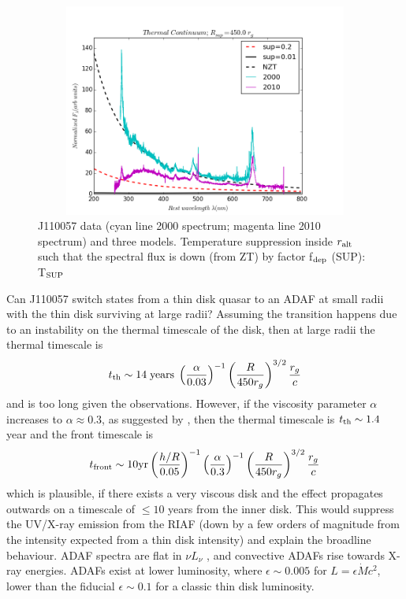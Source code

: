 \documentclass[11pt,a4paper]{article}
\begin{document}
\begin{figure}
  \centering
  \includegraphics[width=16.00cm, height=7.00cm, trim=0.0cm 0.0cm 0.0cm 0.0cm, clip]
  {../plots/models/mcd_gap_v3_1_b1.png}
  \caption[]{
    J110057 data (cyan line 2000 spectrum; magenta line 2010 spectrum) and
    three models.  Temperature suppression inside $r_{\rm alt}$ such that
    the spectral flux is down (from ZT) by factor f$_{\rm dep}$ (SUP): T$_{\rm SUP}$
  }
  \label{fig:disk_suppression}
\end{figure}
Can J110057 switch states from a thin disk quasar to an ADAF at small
radii with the thin disk surviving at large radii?  Assuming the
transition happens due to an instability on the thermal timescale of
the disk, then at large radii the thermal timescale is
\begin{equation}
    t_{\rm th} \sim 14 \; {\rm years} \; \left(\frac{\alpha}{0.03}\right)^{-1}
                                                \left(\frac{R}{450r_{g}}\right)^{3/2} 
                                                        \frac{r_{g}}{c}
\end{equation} 
and is too long given the observations. However, if the viscosity
parameter $\alpha$ increases to $\alpha \approx 0.3$, as suggested by
\citet{King2007}, then the thermal timescale is $t_{\rm th} \sim 1.4$
year and the front timescale is
\begin{equation}
    t_{\rm front}  \sim  10{\rm yr}  \left(\frac{h/R}{0.05}\right)^{-1}
                                                 \left(\frac{\alpha}{0.3}\right)^{-1}  
                                                 \left(\frac{R}{450r_{g}}\right)^{3/2}  
                                                         \frac{r_{g}}{c}
\label{eqn:t_front}
\end{equation}
which is plausible, if there exists a very viscous disk and the effect
propagates outwards on a timescale of $\leq 10$ years from the inner
disk. This would suppress the UV/X-ray emission from the RIAF (down by
a few orders of magnitude from the intensity expected from a thin disk
intensity) and explain the broadline behaviour.  ADAF spectra are flat
in $\nu L_{\nu}$ \citet{Narayan1998, Abramowicz2002, Abramowicz2013},
and convective ADAFs rise towards X-ray energies. ADAFs exist at lower
luminosity, where $\epsilon \sim 0.005$ for $L=\epsilon \dot{M}
c^{2}$, lower than the fiducial $\epsilon \sim 0.1$ for a classic thin
disk luminosity.
\end{document}
